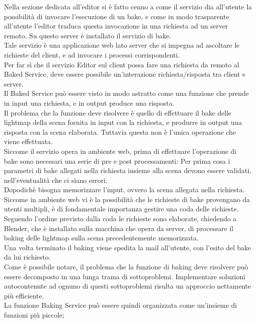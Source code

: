Nella sezione dedicata all’editor si è fatto cenno a come il servizio dia all’utente la possibilità di invocare l’esecuzione di un bake, e come in modo trasparente all’utente l’editor traduca questa invocazione in una richiesta ad un server remoto. Su questo server è installato il servizio di bake. 
\\
Tale servizio è una applicazione web lato server che si impegna ad ascoltare le richieste del client, e ad invocare i processi corrispondenti. 
\\
Per far sì che il servizio Editor sul client possa fare una richiesta da remoto al Baked Service, deve essere possibile un’interazione richiesta/risposta tra client e server.
\\ 
Il Baked Service può essere visto in modo astratto come una funzione che prende in input una richiesta, e in output produce una risposta.
\\ 
Il problema che la funzione deve risolvere è quello di effettuare il bake delle lightmap della scena fornita in input con la richiesta, e produrre in output una risposta con la scena elaborata. Tuttavia questa non è l’unica operazione che viene effettuata. 
\\
Siccome il servizio opera in ambiente web, prima di effettuare l’operazione di bake sono necessari una serie di pre e post processamenti:
Per prima cosa i parametri di bake allegati nella richiesta insieme alla scena devono essere validati, nell’eventualità che ci siano errori. 
\\
Dopodichè bisogna memorizzare l’input, ovvero la scena allegata nella richiesta.
\\ 
Siccome in ambiente web vi è la possibilità che le richieste di bake provengano da utenti multipli, è di fondamentale importanza gestire una coda delle richieste. Seguendo l’ordine previsto dalla coda le richieste sono elaborate, chiedendo a Blender, che è installato sulla macchina che opera da server, di processare il baking delle lightmap sulla scena precedentemente memorizzata.
\\ 
Una volta terminato il baking viene spedita la mail all’utente, con l’esito del bake da lui richiesto. 
\\
Come è possibile notare, il problema che la funzione di baking deve risolvere può essere decomposto in una lunga trama di sottoproblemi. Implementare soluzioni autocontenute ad ognuno di questi sottoproblemi risulta un approccio nettamente più efficiente.
\\
La funzione Baking Service può essere quindi organizzata come un’insieme di funzioni più piccole; 
